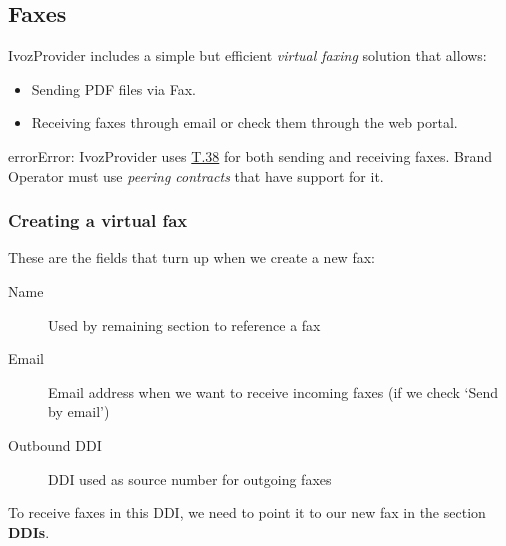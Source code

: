 \documentclass[letterpaper,10pt,english]{sphinxmanual}
\begin{document}
\subsection{Faxes}
\label{administration_portal/client/residential/faxes:faxes}\label{administration_portal/client/residential/faxes::doc}\label{administration_portal/client/residential/faxes:faxing-system}
IvozProvider includes a simple but efficient \emph{virtual faxing} solution that allows:
\begin{itemize}
\item {} 
Sending PDF files via Fax.

\item {} 
Receiving faxes through email or check them through the web portal.

\end{itemize}

\begin{notice}{error}{Error:}
IvozProvider uses
\href{http://www.voip-info.org/wiki/view/T.38}{T.38} for both sending and receiving
faxes. Brand Operator must use \emph{peering contracts} that have support for it.
\end{notice}


\subsubsection{Creating a virtual fax}
\label{administration_portal/client/residential/faxes:creating-a-virtual-fax}
These are the fields that turn up when we create a new fax:
\begin{description}
\item[{Name}] \leavevmode{}\label{administration_portal/client/residential/faxes:term-name}
Used by remaining section to reference a fax

\item[{Email}] \leavevmode{}\label{administration_portal/client/residential/faxes:term-email}
Email address when we want to receive incoming faxes (if we check `Send
by email')

\item[{Outbound DDI}] \leavevmode{}\label{administration_portal/client/residential/faxes:term-outbound-ddi}
DDI used as source number for outgoing faxes

\end{description}

To receive faxes in this DDI, we need to point it to our new fax in the section
\textbf{DDIs}.
\end{document}
